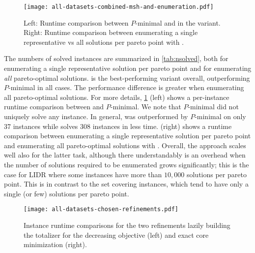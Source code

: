 \begin{figure}
    \centering
    \texttt{[image: all-datasets-combined-msh-and-enumeration.pdf]}
    \caption{Left: Runtime comparison between $P$-minimal and \algname{} in the \msh{} variant. %
      Right: Runtime comparison between enumerating a single representative vs all solutions per pareto point with \msh{}.
    }\label{fig:msh-scatter}
\end{figure}

The numbers of solved instances are summarized in \cref{tab:nsolved}, both for  enumerating a single representative solution per pareto point and for enumerating \emph{all} pareto-optimal solutions.
\msh{} is the best-performing \algname{} variant overall, outperforming $P$-minimal in all cases.
The performance difference is greater when enumerating all pareto-optimal solutions.
For more details, \cref{fig:msh-scatter} (left) shows a per-instance runtime comparison between \msh{} and $P$-minimal.
We note that $P$-minimal did not uniquely solve any instance.
In general, \msh{} was outperformed by $P$-minimal on only 37 instances while \msh{} solves 308 instances in less time.
 (right) shows a runtime comparison between enumerating a single representative solution per pareto point and enumerating all pareto-optimal solutions with \msh{}.
Overall, the approach scales well also for the latter task, although there understandably is an overhead when the number of solutions required to be enumerated grows significantly;
this is the case for LIDR where some instances have more than $10,000$ solutions per pareto point.
This is in contrast to the set covering instances, which tend to have only a single (or few) solutions per pareto point.

\begin{figure}
    \centering
    \texttt{[image: all-datasets-chosen-refinements.pdf]}
    \caption{Instance runtime comparisons for the two refinements lazily building the totalizer for the decreasing objective (left) and exact core minimization (right).
      } \label{fig:refinements}
\end{figure}

